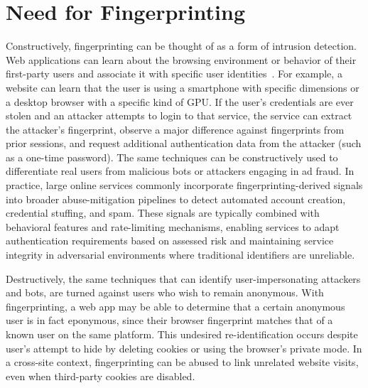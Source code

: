 \section{Need for Fingerprinting}
\label{sec:need-for-fingerprinting}

Constructively, fingerprinting can be thought of as a form of intrusion detection.
%
Web applications can learn about the browsing environment or behavior of their first-party users and associate it with specific user identities~\cite{LinPhishSheepsClothing2022}.
%
For example, a website can learn that the user is using a smartphone with specific dimensions or a desktop browser with a specific kind of GPU.
%
If the user's credentials are ever stolen and an attacker attempts to login to that service, the service can extract the attacker's fingerprint, observe a major difference against fingerprints from prior sessions, and request additional authentication data from the attacker (such as a one-time password).
%
The same techniques can be constructively used to differentiate real users from malicious bots or attackers engaging in ad fraud.
%
In practice, large online services commonly incorporate fingerprinting-derived signals into broader abuse-mitigation pipelines to detect automated account creation, credential stuffing, and spam. 
%
These signals are typically combined with behavioral features and rate-limiting mechanisms, enabling services to adapt authentication requirements based on assessed risk and maintaining service integrity in adversarial environments where traditional identifiers are unreliable.

Destructively, the same techniques that can identify user-impersonating attackers and bots, are turned against users who wish to remain anonymous.
%
With fingerprinting, a web app may be able to determine that a certain anonymous user is in fact eponymous, since their browser fingerprint matches that of a known user on the same platform.
%
This undesired re-identification occurs despite user's attempt to hide by deleting cookies or using the browser's private mode.
%
In a cross-site context, fingerprinting can be abused to link unrelated website visits, even when third-party cookies are disabled.